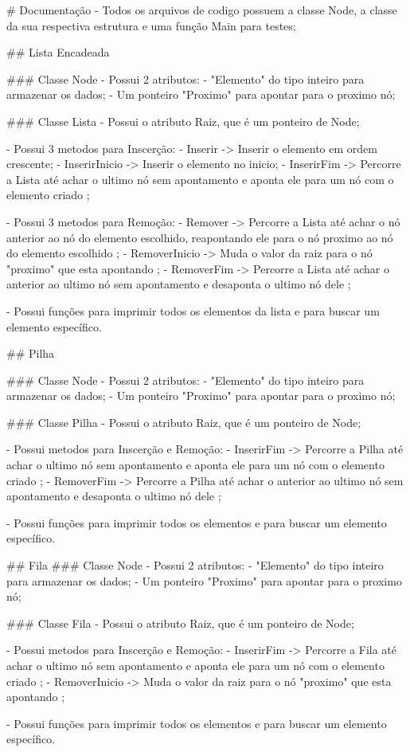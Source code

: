 # Documentação
- Todos os arquivos de codigo possuem a classe Node, a classe da sua respectiva estrutura e uma função Main para testes;

## Lista Encadeada

### Classe Node
- Possui 2 atributos:
    - "Elemento" do tipo inteiro para armazenar os dados;
    - Um ponteiro "Proximo" para apontar para o proximo nó;

### Classe Lista
- Possui o atributo Raiz, que é um ponteiro de Node;

- Possui 3 metodos para Inscerção:
    - Inserir -> Inserir o elemento em ordem crescente;
    - InserirInicio -> Inserir o elemento no inicio;
    - InserirFim -> Percorre a Lista até achar o ultimo nó sem apontamento e aponta ele para um nó com o elemento criado ;

- Possui 3 metodos para Remoção:
    - Remover -> Percorre a Lista até achar o nó anterior ao nó do elemento escolhido, reapontando ele para o nó proximo ao nó do elemento escolhido   ;
    - RemoverInicio -> Muda o valor da raiz para o nó "proximo" que esta apontando  ;
    - RemoverFim -> Percorre a Lista até achar o anterior ao ultimo nó sem apontamento e desaponta o ultimo nó dele ;

- Possui funções para imprimir todos os elementos da lista e para buscar um elemento específico.

## Pilha

### Classe Node
- Possui 2 atributos:
    - "Elemento" do tipo inteiro para armazenar os dados;
    - Um ponteiro "Proximo" para apontar para o proximo nó;

### Classe Pilha
- Possui o atributo Raiz, que é um ponteiro de Node;

- Possui  metodos para Inscerção e Remoção:
    - InserirFim -> Percorre a Pilha até achar o ultimo nó sem apontamento e aponta ele para um nó com o elemento criado ;
    - RemoverFim -> Percorre a Pilha até achar o anterior ao ultimo nó sem apontamento e desaponta o ultimo nó dele ;

- Possui funções para imprimir todos os elementos e para buscar um elemento específico.


## Fila
### Classe Node
- Possui 2 atributos:
    - "Elemento" do tipo inteiro para armazenar os dados;
    - Um ponteiro "Proximo" para apontar para o proximo nó;

### Classe Fila
- Possui o atributo Raiz, que é um ponteiro de Node;

- Possui  metodos para Inscerção e Remoção:
    - InserirFim -> Percorre a Fila até achar o ultimo nó sem apontamento e aponta ele para um nó com o elemento criado ;
    - RemoverInicio -> Muda o valor da raiz para o nó "proximo" que esta apontando  ;

- Possui funções para imprimir todos os elementos e para buscar um elemento específico.


